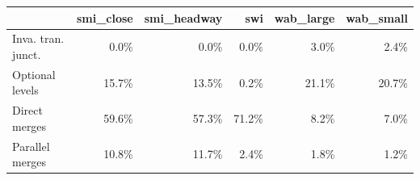\begin{tabular}{lrrrrr}\toprule
&smi\_close &smi\_headway &swi &wab\_large &wab\_small \\\midrule
Inva. tran. junct. &0.0\% &0.0\% &0.0\% &3.0\% &2.4\% \\
Optional levels &15.7\% &13.5\% &0.2\% &21.1\% &20.7\% \\
Direct merges  &59.6\% &57.3\% &71.2\% &8.2\% &7.0\% \\
Parallel merges &10.8\% &11.7\% &2.4\% &1.8\% &1.2\% \\
\bottomrule
\end{tabular}